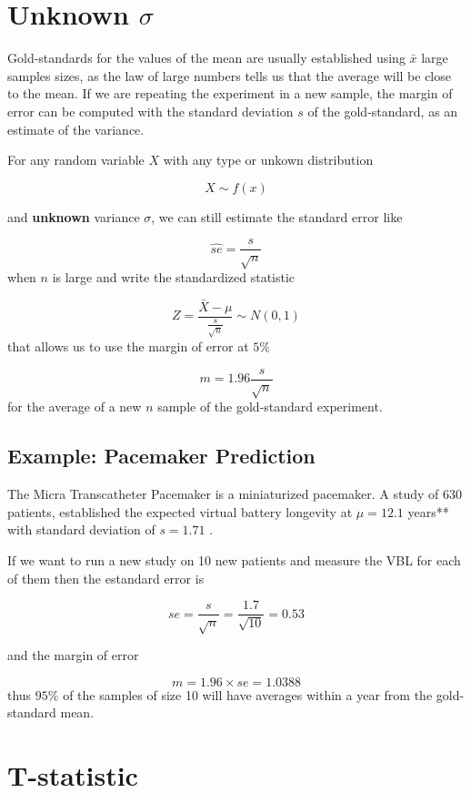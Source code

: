 \documentclass[
]{book}
\begin{document}
\hypertarget{unknown-sigma}{%
\section{\texorpdfstring{Unknown \(\sigma\)}{Unknown \textbackslash sigma}}\label{unknown-sigma}}

Gold-standards for the values of the mean are usually established using \(\bar{x}\) large samples sizes, as the law of large numbers tells us that the average will be close to the mean. If we are repeating the experiment in a new sample, the margin of error can be computed with the standard deviation \(s\) of the gold-standard, as an estimate of the variance.

For any random variable \(X\) with any type or unkown distribution

\[X \sim f(x)\]

and \textbf{unknown} variance \(\sigma\), we can still estimate the standard error like

\[\hat{se}=\frac{s}{\sqrt{n}}\] when \(n\) is large and write the standardized statistic

\[Z=\frac{\bar{X}-\mu}{\frac{s}{\sqrt{n}}}\sim N(0,1) \]
that allows us to use the margin of error at \(5\%\)

\[m= 1.96 \frac{s}{\sqrt{n}}\]
for the average of a new \(n\) sample of the gold-standard experiment.

\hypertarget{example-pacemaker-prediction-1}{%
\subsection{\texorpdfstring{\textbf{Example: Pacemaker Prediction}}{Example: Pacemaker Prediction}}\label{example-pacemaker-prediction-1}}

The Micra Transcatheter Pacemaker is a miniaturized pacemaker. A study of 630 patients, established the expected virtual battery longevity at \(\mu=12.1\) years** with standard deviation of \(s=1.71\) \citep{Duray2017Micra12mo}.

If we want to run a new study on 10 new patients and measure the VBL for each of them then the estandard error is

\[se=\frac{s}{\sqrt{n}}=\frac{1.7}{\sqrt{10}}= 0.53\]

and the margin of error

\[m= 1.96\times se= 1.0388\]
thus \(95\%\) of the samples of size 10 will have averages within a year from the gold-standard mean.

\hypertarget{t-statistic}{%
\section{T-statistic}\label{t-statistic}}
\end{document}

